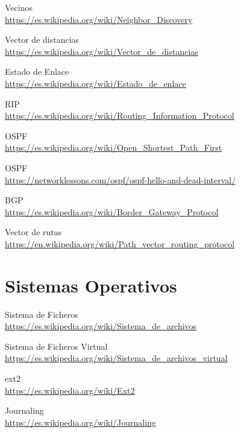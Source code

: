 \begin{thebibliography}{9}
\bibitem{} 
Vecinos
\\\url{https://es.wikipedia.org/wiki/Neighbor\_Discovery}

\bibitem{} 
Vector de distancias
\\\url{https://es.wikipedia.org/wiki/Vector\_de\_distancias}

\bibitem{} 
Estado de Enlace
\\\url{https://es.wikipedia.org/wiki/Estado\_de\_enlace}

\bibitem{} 
RIP
\\\url{https://es.wikipedia.org/wiki/Routing\_Information\_Protocol}

\bibitem{} 
OSPF
\\\url{https://es.wikipedia.org/wiki/Open\_Shortest\_Path\_First}

\bibitem{} 
OSPF
\\\url{https://networklessons.com/ospf/ospf-hello-and-dead-interval/}

\bibitem{} 
BGP
\\\url{https://es.wikipedia.org/wiki/Border\_Gateway\_Protocol}

\bibitem{} 
Vector de rutas
\\\url{https://en.wikipedia.org/wiki/Path\_vector\_routing\_protocol}
\section*{Sistemas Operativos}
\bibitem{} 
Sistema de Ficheros
\\\url{https://es.wikipedia.org/wiki/Sistema\_de\_archivos}

\bibitem{} 
Sistema de Ficheros Virtual
\\\url{https://es.wikipedia.org/wiki/Sistema\_de\_archivos\_virtual}

\bibitem{} 
ext2
\\\url{https://es.wikipedia.org/wiki/Ext2}

\bibitem{} 
Journaling
\\\url{https://es.wikipedia.org/wiki/Journaling}


\end{thebibliography}

